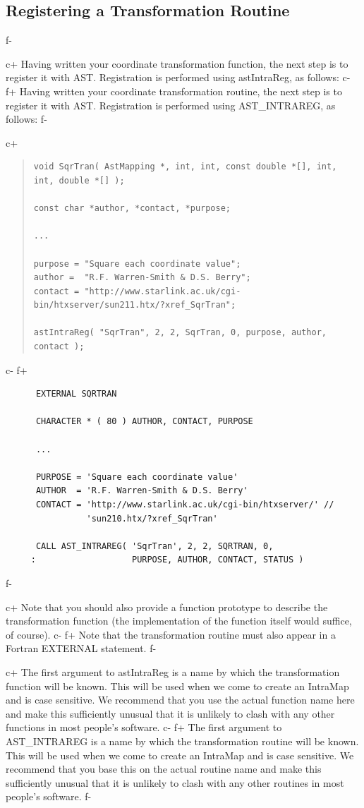 \documentclass[twoside,11pt]{article}
\begin{document}
\subsection{\label{ss:registeringintramaps}Registering a Transformation Routine}
f-

c+
Having written your coordinate transformation function, the next step
is to register it with AST. Registration is performed using
astIntraReg, as follows:
c-
f+
Having written your coordinate transformation routine, the next step
is to register it with AST. Registration is performed using
AST\_INTRAREG, as follows:
f-

c+
\begin{quote}
\small
\begin{verbatim}
void SqrTran( AstMapping *, int, int, const double *[], int, int, double *[] );

const char *author, *contact, *purpose;

...

purpose = "Square each coordinate value";
author =  "R.F. Warren-Smith & D.S. Berry";
contact = "http://www.starlink.ac.uk/cgi-bin/htxserver/sun211.htx/?xref_SqrTran";

astIntraReg( "SqrTran", 2, 2, SqrTran, 0, purpose, author, contact );
\end{verbatim}
\normalsize
\end{quote}
c-
f+
\small
\begin{verbatim}
      EXTERNAL SQRTRAN

      CHARACTER * ( 80 ) AUTHOR, CONTACT, PURPOSE

      ...

      PURPOSE = 'Square each coordinate value'
      AUTHOR  = 'R.F. Warren-Smith & D.S. Berry'
      CONTACT = 'http://www.starlink.ac.uk/cgi-bin/htxserver/' //
                'sun210.htx/?xref_SqrTran'

      CALL AST_INTRAREG( 'SqrTran', 2, 2, SQRTRAN, 0,
     :                   PURPOSE, AUTHOR, CONTACT, STATUS )
\end{verbatim}
\normalsize
f-

c+
Note that you should also provide a function prototype to describe the
transformation function (the implementation of the function itself
would suffice, of course).
c-
f+
Note that the transformation routine must also appear in a Fortran
EXTERNAL statement.
f-

c+
The first argument to astIntraReg is a name by which the
transformation function will be known. This will be used when we come
to create an IntraMap and is case sensitive. We recommend that you use
the actual function name here and make this sufficiently unusual that
it is unlikely to clash with any other functions in most people's
software.
c-
f+
The first argument to AST\_INTRAREG is a name by which the
transformation routine will be known. This will be used when we come
to create an IntraMap and is case sensitive. We recommend that you
base this on the actual routine name and make this sufficiently
unusual that it is unlikely to clash with any other routines in most
people's software.
f-
\end{document}
